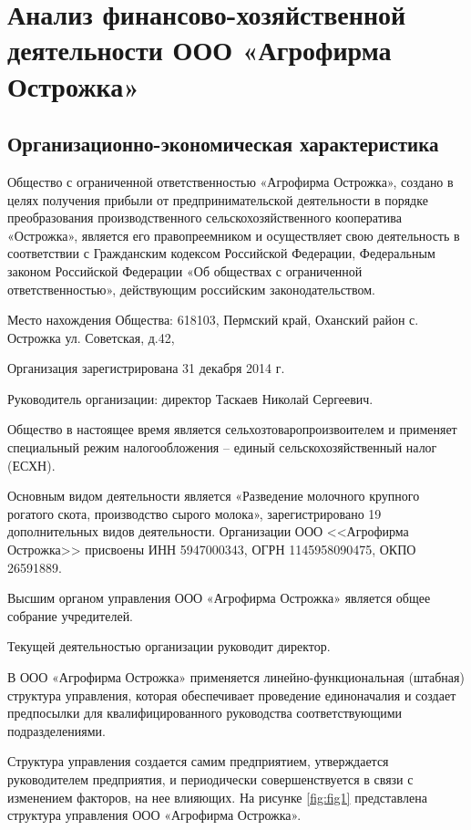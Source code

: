 \section{Анализ финансово-хозяйственной деятельности ООО «Агрофирма Острожка»}
\subsection{Организационно-экономическая характеристика}



Общество с ограниченной ответственностью «Агрофирма Острожка», создано в целях получения прибыли от предпринимательской деятельности в порядке преобразования производственного сельскохозяйственного кооператива «Острожка», является его правопреемником и осуществляет свою деятельность в соответствии с Гражданским кодексом Российской Федерации, Федеральным законом Российской Федерации «Об обществах с ограниченной ответственностью», действующим российским законодательством.

Место нахождения Общества: 618103, Пермский край, Оханский район с. Острожка ул. Советская, д.42,

Организация зарегистрирована 31 декабря 2014 г.

Руководитель организации: директор Таскаев Николай Сергеевич.

Общество в настоящее время является сельхозтоваропроизвоителем и применяет специальный режим налогообложения – единый сельскохозяйственный налог (ЕСХН).

Основным видом деятельности является «Разведение молочного крупного рогатого скота, производство сырого молока», зарегистрировано 19 дополнительных видов деятельности. Организации ООО <<Агрофирма Острожка>> присвоены ИНН 5947000343, ОГРН 1145958090475, ОКПО 26591889.

Высшим органом управления ООО «Агрофирма Острожка» является общее собрание учредителей.

Текущей деятельностью организации руководит директор.

В ООО «Агрофирма Острожка» применяется линейно-функциональная (штабная) структура управления, которая обеспечивает проведение единоначалия и создает предпосылки для квалифицированного руководства соответствующими подразделениями.


Структура управления создается самим предприятием, утверждается руководителем предприятия, и периодически совершенствуется в связи с изменением факторов, на нее влияющих.
На рисунке \ref{fig:fig1} представлена структура управления ООО «Агрофирма Острожка».

